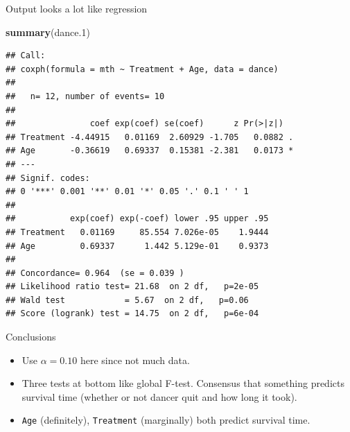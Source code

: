 \documentclass[ignorenonframetext,]{beamer}
\newenvironment{Shaded}{\begin{snugshade}}{\end{snugshade}}
\newcommand{\FloatTok}[1]{\textcolor[rgb]{0.00,0.00,0.81}{#1}}
\newcommand{\KeywordTok}[1]{\textcolor[rgb]{0.13,0.29,0.53}{\textbf{#1}}}
\newcommand{\NormalTok}[1]{#1}
\begin{document}
\begin{frame}[fragile]{Output looks a lot like regression}
\protect\hypertarget{output-looks-a-lot-like-regression}{}

\scriptsize

\begin{Shaded}
\begin{Highlighting}[]
\KeywordTok{summary}\NormalTok{(dance}\FloatTok{.1}\NormalTok{)}
\end{Highlighting}
\end{Shaded}

\begin{verbatim}
## Call:
## coxph(formula = mth ~ Treatment + Age, data = dance)
## 
##   n= 12, number of events= 10 
## 
##               coef exp(coef) se(coef)      z Pr(>|z|)  
## Treatment -4.44915   0.01169  2.60929 -1.705   0.0882 .
## Age       -0.36619   0.69337  0.15381 -2.381   0.0173 *
## ---
## Signif. codes:  
## 0 '***' 0.001 '**' 0.01 '*' 0.05 '.' 0.1 ' ' 1
## 
##           exp(coef) exp(-coef) lower .95 upper .95
## Treatment   0.01169     85.554 7.026e-05    1.9444
## Age         0.69337      1.442 5.129e-01    0.9373
## 
## Concordance= 0.964  (se = 0.039 )
## Likelihood ratio test= 21.68  on 2 df,   p=2e-05
## Wald test            = 5.67  on 2 df,   p=0.06
## Score (logrank) test = 14.75  on 2 df,   p=6e-04
\end{verbatim}

\normalsize

\end{frame}

\begin{frame}[fragile]{Conclusions}
\protect\hypertarget{conclusions-1}{}

\begin{itemize}
\item
  Use \(\alpha=0.10\) here since not much data.
\item
  Three tests at bottom like global F-test. Consensus that something
  predicts survival time (whether or not dancer quit and how long it
  took).
\item
  \texttt{Age} (definitely), \texttt{Treatment} (marginally) both
  predict survival time.
\end{itemize}

\end{frame}
\end{document}

